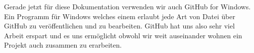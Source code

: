 Gerade jetzt für diese Dokumentation verwenden wir auch GitHub for Windows. Ein Programm für 
Windows 
welches einem erlaubt jede Art von Datei über GitHub zu veröffentlichen und zu bearbeiten. GitHub 
hat uns also sehr viel Arbeit erspart und es uns ermöglicht obwohl wir weit auseinander wohnen ein 
Projekt auch zusammen zu erarbeiten.\\


